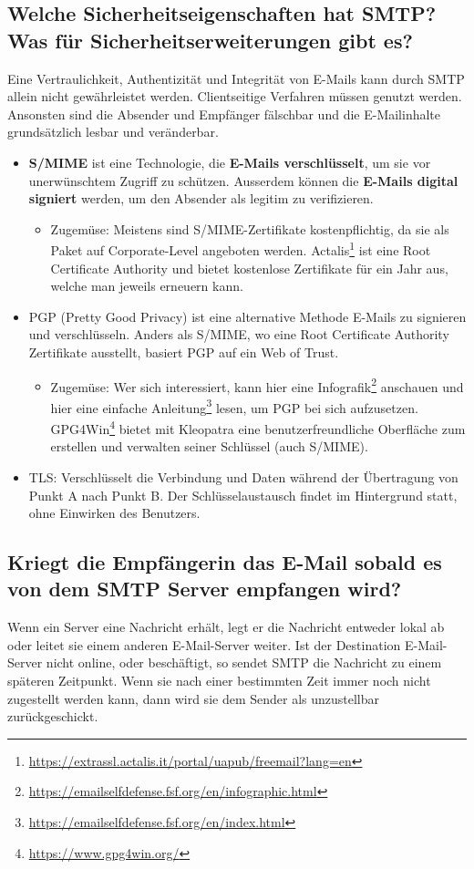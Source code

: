 \subsection*{Welche Sicherheitseigenschaften hat SMTP? Was für Sicherheitserweiterungen gibt es?}
Eine Vertraulichkeit, Authentizität und Integrität von E-Mails kann durch SMTP allein nicht gewährleistet werden. Clientseitige Verfahren müssen genutzt werden. Ansonsten sind die Absender und Empfänger fälschbar und die E-Mailinhalte grundsätzlich lesbar und veränderbar.
\begin{itemize}
    \item \textbf{S/MIME} ist eine Technologie, die \textbf{E-Mails verschlüsselt}, um sie vor unerwünschtem Zugriff zu schützen. Ausserdem können die \textbf{E-Mails digital signiert} werden, um den Absender als legitim zu verifizieren.
    \begin{itemize}
        \item Zugemüse: Meistens sind S/MIME-Zertifikate kostenpflichtig, da sie als Paket auf Corporate-Level angeboten werden. Actalis\footnote{\url{https://extrassl.actalis.it/portal/uapub/freemail?lang=en}} ist eine Root Certificate Authority und bietet kostenlose Zertifikate für ein Jahr aus, welche man jeweils erneuern kann.
    \end{itemize}
    \item PGP (Pretty Good Privacy) ist eine alternative Methode E-Mails zu signieren und verschlüsseln. Anders als S/MIME, wo eine Root Certificate Authority Zertifikate ausstellt, basiert PGP auf ein Web of Trust.
    \begin{itemize}
        \item Zugemüse: Wer sich interessiert, kann hier eine Infografik\footnote{\url{https://emailselfdefense.fsf.org/en/infographic.html}} anschauen und hier eine einfache Anleitung\footnote{\url{https://emailselfdefense.fsf.org/en/index.html}} lesen, um PGP bei sich aufzusetzen. GPG4Win\footnote{\url{https://www.gpg4win.org/}} bietet mit Kleopatra eine benutzerfreundliche Oberfläche zum erstellen und verwalten seiner Schlüssel (auch S/MIME).
    \end{itemize}
    \item TLS: Verschlüsselt die Verbindung und Daten während der Übertragung von Punkt A nach Punkt B. Der Schlüsselaustausch findet im Hintergrund statt, ohne Einwirken des Benutzers.
\end{itemize}

\subsection*{Kriegt die Empfängerin das E-Mail sobald es von dem SMTP Server empfangen wird?}
Wenn ein Server eine Nachricht erhält, legt er die Nachricht entweder lokal ab oder leitet sie einem anderen E-Mail-Server weiter. Ist der Destination E-Mail-Server nicht online, oder beschäftigt, so sendet SMTP die Nachricht zu einem späteren Zeitpunkt. Wenn sie nach einer bestimmten Zeit immer noch nicht zugestellt werden kann, dann wird sie dem Sender als unzustellbar zurückgeschickt.


